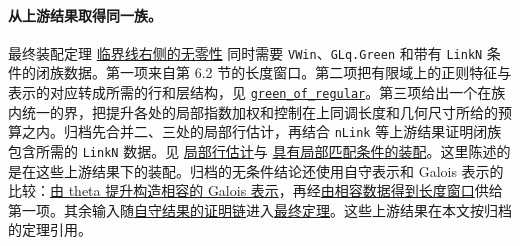 \documentclass[UTF8,fontset=none,a4paper,11pt]{ctexart}
\theoremstyle{definition}
\newcommand{\src}[3]{\href{https://github.com/leanprover-community/riemann-hypothesis/blob/23aebbb302010b292314d406aa97f7901d698634/src/#1.lean\#L#2}{#3}}
\begin{document}
\paragraph{从上游结果取得同一族。}
最终装配定理 \src{Development/AutomorphicArithmetic/ThetaCorrespondence/ThetaPairLifts/ThirdPlaceSeries/TopPlug}{12}{临界线右侧的无零性} 同时需要 \texttt{VWin}、\texttt{GLq.Green} 和带有 \texttt{LinkN} 条件的闭族数据。第一项来自第 6.2 节的长度窗口。第二项把有限域上的正则特征与表示的对应转成所需的行和层结构，见 \src{Development/AbelianVarietyTheory/Proofs/InertiaEigenvalues/SumRangeEqRoots}{225}{\texttt{green\_of\_regular}}。第三项给出一个在族内统一的界，把提升各处的局部指数加权和控制在上同调长度和几何尺寸所给的预算之内。归档先合并二、三处的局部行估计，再结合 \texttt{nLink} 等上游结果证明闭族包含所需的 \texttt{LinkN} 数据。见 \src{Development/AutomorphicArithmetic/ThetaCorrespondence/ThetaPairLifts/ThirdPlaceSeries/At23OfAll}{24}{局部行估计}与
\src{Development/AutomorphicArithmetic/ThetaCorrespondence/ThetaPairLifts/ThirdPlaceSeries/SiegelEisensteinSecondTermHypotheses}{69}{具有局部匹配条件的装配}。这里陈述的是在这些上游结果下的装配。归档的无条件结论还使用自守表示和 Galois 表示的比较：\src{Development/AutomorphicArithmetic/Foundations/GaloisRepresentations/IntegralStructures/RowSrc}{6}{由 theta 提升构造相容的 Galois 表示}，再经\src{Development/AutomorphicArithmetic/AutomorphicVarieties/ModularityArgument/ThresholdArguments/DenseThresholdCases/VwinOfRow}{4}{由相容数据得到长度窗口}供给第一项。其余输入随\src{Development/AutomorphicArithmetic/ThetaCorrespondence/ThetaPairLifts/ThirdPlaceSeries/EveryCharacterOfLiteratureOfVWin}{810}{自守结果的证明链}进入\src{Development/AutomorphicArithmetic/CharacterBoxes/MainConclusion}{7}{最终定理}。这些上游结果在本文按归档的定理引用。
\end{document}
